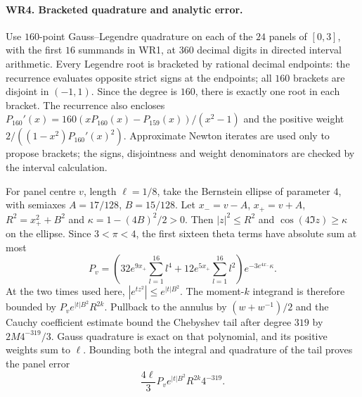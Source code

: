 \paragraph{WR4. Bracketed quadrature and analytic error.}
Use $160$-point Gauss--Legendre quadrature on each of the $24$
panels of $[0,3]$, with the first $16$ summands in WR1, at
$360$ decimal digits in directed interval arithmetic. Every
Legendre root is bracketed by rational decimal endpoints: the
recurrence evaluates opposite strict signs at the endpoints;
all $160$ brackets are disjoint in $(-1,1)$. Since the degree is
$160$, there is exactly one root in each bracket. The recurrence
also encloses
$P_{160}'(x)=160(xP_{160}(x)-P_{159}(x))/(x^2-1)$ and the
positive weight $2/((1-x^2)P_{160}'(x)^2)$.
Approximate Newton iterates are used only to propose brackets;
the signs, disjointness and weight denominators are checked by
the interval calculation.

For panel centre $v$, length $\ell=1/8$, take the Bernstein
ellipse of parameter $4$, with semiaxes $A=17/128$, $B=15/128$.
Let $x_-=v-A$, $x_+=v+A$, $R^2=x_+^2+B^2$ and
$\kappa=1-(4B)^2/2>0$. Then $|z|^2\le R^2$ and
$\cos(4\Im z)\ge\kappa$ on the ellipse. Since $3<\pi<4$,
the first sixteen theta terms have absolute sum at most
\[
 P_v=\left(32e^{9x_+}\sum_{l=1}^{16}l^4
              +12e^{5x_+}\sum_{l=1}^{16}l^2\right)
                      e^{-3e^{4x_-}\kappa}.
 \tag{WR8}
\]
At the two times used here, $|e^{tz^2}|\le e^{|t|B^2}$.
The moment-$k$ integrand is therefore bounded by
$P_ve^{|t|B^2}R^{2k}$. Pullback to the annulus by
$(w+w^{-1})/2$ and the Cauchy coefficient estimate bound the
Chebyshev tail after degree $319$ by $2M4^{-319}/3$.
Gauss quadrature is exact on that polynomial, and its positive
weights sum to $\ell$. Bounding both the integral and quadrature
of the tail proves the panel error
\[
 \frac{4\ell}{3}P_ve^{|t|B^2}R^{2k}4^{-319}.
 \tag{WR9}
\]

